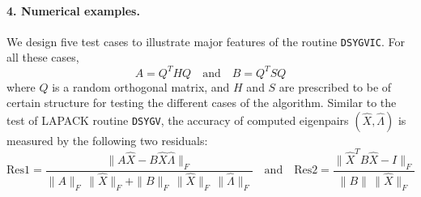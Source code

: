 \documentclass[11pt]{article}
\begin{document}
\paragraph{4. Numerical examples.}  
We design five test cases to illustrate 
major features of the routine {\tt DSYGVIC}. 
For all these cases, 
\begin{equation*}
A=Q^T H Q \quad\mbox{and}\quad B = Q^T S Q
\end{equation*}
where $Q$ is a random orthogonal matrix, and
$H$ and $S$ are prescribed to be of certain structure for
testing the different cases of the algorithm. 
Similar to the test of LAPACK routine {\tt DSYGV},
the accuracy of computed eigenpairs $(\widehat{X}, \widehat{\Lambda})$ is 
measured by the following two residuals:
\begin{equation*}
\mbox{Res1} = \frac{\|A \widehat{X} - B \widehat{X} \widehat{\Lambda}\|_F}
{\|A\|_F\,\|\widehat{X}\|_F + \|B\|_F\,\|\widehat{X}\|_F\,\|\widehat{\Lambda}\|_F}
\quad \mbox{and} \quad 
\mbox{Res2} = \frac{\|\widehat{X}^T B \widehat{X} - I\|_F}
                   {\|B\|\,\|\widehat{X}\|_F}
\end{equation*}
\end{document}
